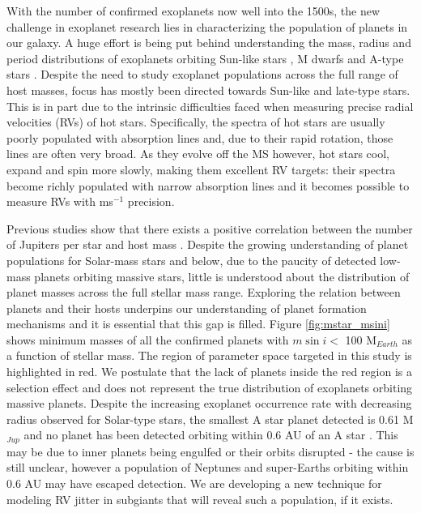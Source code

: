 \documentclass[useAMS, usenatbib]{aastex}
\begin{document}
With the number of confirmed exoplanets now well into the 1500s, the new
challenge in exoplanet research lies in characterizing the population of
planets in our galaxy.
A huge effort is being put behind understanding the mass, radius and period
distributions of exoplanets orbiting Sun-like stars
\citep[e.g.][]{Butler2006, Howard2010, Petigura2013, Foreman-Mackey2014},
M dwarfs \citep{Dressing2015} and A-type stars \citep{Johnson2010a}.
Despite the need to study exoplanet populations across the full range of host
masses, focus has mostly been directed towards Sun-like and late-type stars.
This is in part due to the intrinsic difficulties faced when measuring precise
radial velocities (RVs) of hot stars.
Specifically, the spectra of hot stars are usually poorly populated with
absorption lines and, due to their rapid rotation, those lines are often very
broad.
As they evolve off the MS however, hot stars cool, expand and spin more
slowly, making them excellent RV targets: their spectra become richly
populated with narrow absorption lines and it becomes possible to measure RVs
with ms$^{-1}$ precision.

Previous studies show that there exists a positive correlation between the
number of Jupiters per star and host mass \citep{Johnson2010a, Bowler2010,
Lovis2007}.
Despite the growing understanding of planet populations for Solar-mass stars
and below, due to the paucity of detected low-mass planets orbiting massive
stars, little is understood about the distribution of planet masses across the
full stellar mass range.
Exploring the relation between planets and their hosts underpins our
understanding of planet formation mechanisms and it is essential that this gap
is filled.
Figure \ref{fig:mstar_msini} shows minimum masses of all the confirmed planets
with $m\sin i <$ 100 M$_{Earth}$ as a function of stellar mass.
The region of parameter space targeted in this study is highlighted in red.
We postulate that the lack of planets inside the red region is a selection
effect and does not represent the true distribution of exoplanets orbiting
massive planets.
Despite the increasing exoplanet occurrence rate with decreasing radius
observed for Solar-type stars, the smallest A star planet detected is 0.61
M$_{Jup}$ and no planet has been detected orbiting within 0.6 AU of an A star
\citep{Johnson2007}.
This may be due to inner planets being engulfed or their orbits
disrupted - the cause is still unclear, however a population of Neptunes and
super-Earths orbiting within 0.6 AU may have escaped detection.
We are developing a new technique for modeling RV jitter in subgiants that will
reveal such a population, if it exists.
\end{document}

